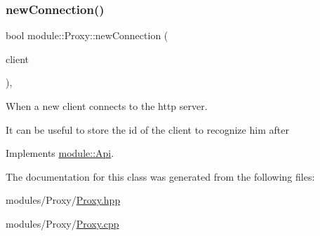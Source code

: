 \subsubsection{\texorpdfstring{new\+Connection()}{newConnection()}}
{\footnotesize\ttfamily bool module\+::\+Proxy\+::new\+Connection (\begin{DoxyParamCaption}\item[{const \hyperlink{structnet_1_1IClient}{net\+::\+I\+Client} \&}]{client }\end{DoxyParamCaption})\hspace{0.3cm}{\ttfamily [virtual]}, {\ttfamily [noexcept]}}



When a new client connects to the http server. 

It can be useful to store the id of the client to recognize him after 

Implements \hyperlink{structmodule_1_1Api_aa83ddc92765200dd65f915498175c2be}{module\+::\+Api}.



The documentation for this class was generated from the following files\+:\begin{DoxyCompactItemize}
\item 
modules/\+Proxy/\hyperlink{Proxy_8hpp}{Proxy.\+hpp}\item 
modules/\+Proxy/\hyperlink{Proxy_8cpp}{Proxy.\+cpp}\end{DoxyCompactItemize}
